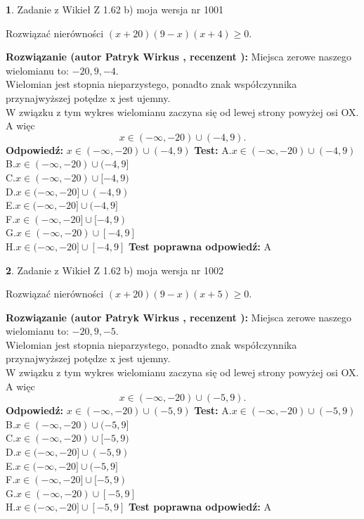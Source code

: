 \documentclass[12pt, a4paper]{article}
\theoremstyle{definition} %
\newtheorem{zad}{}
\newcommand{\zadStart}[1]{\begin{zad}#1\newline}
\newcommand{\zadStop}{\end{zad}}
\newcommand{\rozwStart}[2]{\noindent \textbf{Rozwiązanie (autor #1 , recenzent #2): }\newline}
\newcommand{\rozwStop}{\newline}
\newcommand{\odpStart}{\noindent \textbf{Odpowiedź:}\newline}
\newcommand{\odpStop}{\newline}
\newcommand{\testStart}{\noindent \textbf{Test:}\newline}
\newcommand{\testStop}{\newline}
\newcommand{\kluczStart}{\noindent \textbf{Test poprawna odpowiedź:}\newline}
\newcommand{\kluczStop}{\newline}
\begin{document}
\zadStart{Zadanie z Wikieł Z 1.62 b) moja wersja nr 1001}

Rozwiązać nierówności $(x+20)(9-x)(x+4)\ge0$.
\zadStop
\rozwStart{Patryk Wirkus}{}
Miejsca zerowe naszego wielomianu to: $-20, 9, -4$.\\
Wielomian jest stopnia nieparzystego, ponadto znak współczynnika przy\linebreak najwyższej potędze x jest ujemny.\\ W związku z tym wykres wielomianu zaczyna się od lewej strony powyżej osi OX. A więc $$x \in (-\infty,-20) \cup (-4,9).$$
\rozwStop
\odpStart
$x \in (-\infty,-20) \cup (-4,9)$
\odpStop
\testStart
A.$x \in (-\infty,-20) \cup (-4,9)$\\
B.$x \in (-\infty,-20) \cup (-4,9]$\\
C.$x \in (-\infty,-20) \cup [-4,9)$\\
D.$x \in (-\infty,-20] \cup (-4,9)$\\
E.$x \in (-\infty,-20] \cup (-4,9]$\\
F.$x \in (-\infty,-20] \cup [-4,9)$\\
G.$x \in (-\infty,-20) \cup [-4,9]$\\
H.$x \in (-\infty,-20] \cup [-4,9]$
\testStop
\kluczStart
A
\kluczStop



\zadStart{Zadanie z Wikieł Z 1.62 b) moja wersja nr 1002}

Rozwiązać nierówności $(x+20)(9-x)(x+5)\ge0$.
\zadStop
\rozwStart{Patryk Wirkus}{}
Miejsca zerowe naszego wielomianu to: $-20, 9, -5$.\\
Wielomian jest stopnia nieparzystego, ponadto znak współczynnika przy\linebreak najwyższej potędze x jest ujemny.\\ W związku z tym wykres wielomianu zaczyna się od lewej strony powyżej osi OX. A więc $$x \in (-\infty,-20) \cup (-5,9).$$
\rozwStop
\odpStart
$x \in (-\infty,-20) \cup (-5,9)$
\odpStop
\testStart
A.$x \in (-\infty,-20) \cup (-5,9)$\\
B.$x \in (-\infty,-20) \cup (-5,9]$\\
C.$x \in (-\infty,-20) \cup [-5,9)$\\
D.$x \in (-\infty,-20] \cup (-5,9)$\\
E.$x \in (-\infty,-20] \cup (-5,9]$\\
F.$x \in (-\infty,-20] \cup [-5,9)$\\
G.$x \in (-\infty,-20) \cup [-5,9]$\\
H.$x \in (-\infty,-20] \cup [-5,9]$
\testStop
\kluczStart
A
\kluczStop
\end{document}
